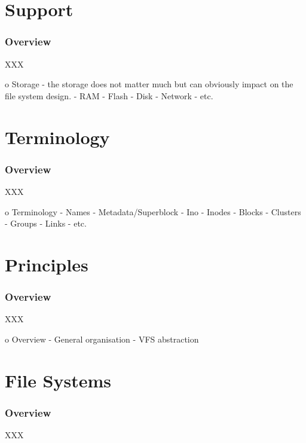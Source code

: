 %
%

\section{Support}


\begin{frame}
  \frametitle{Overview}

  XXX
\end{frame}

o Storage
 - the storage does not matter much but can obviously impact on the file system design.
   - RAM
   - Flash
   - Disk
   - Network
   - etc.

%
%

\section{Terminology}


\begin{frame}
  \frametitle{Overview}

  XXX
\end{frame}

o Terminology
  - Names
  - Metadata/Superblock
  - Ino
  - Inodes
  - Blocks
  - Clusters
  - Groups
  - Links
  - etc.

%
%

\section{Principles}


\begin{frame}
  \frametitle{Overview}

  XXX
\end{frame}

o Overview
  - General organisation
  - VFS abstraction

%
%

\section{File Systems}


\begin{frame}
  \frametitle{Overview}

  XXX
\end{frame}

